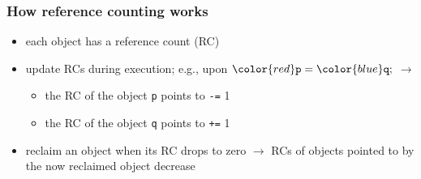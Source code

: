 \documentclass[12pt,dvipdfmx]{beamer}
\newif\ifja
\newif\ifeng
\newcommand{\ao}[1]{{\color{blue}#1}}
\newcommand{\aka}[1]{{\color{red}#1}}
\begin{document}
\begin{frame}[fragile]
\frametitle{How reference counting works}
\begin{itemize}
\item each object has a reference count (RC)
\item update RCs during execution;
  e.g., upon $\aka{\tt p} = \ao{\tt q};$
$\rightarrow$
  \begin{itemize}
  \item the RC of the object \aka{\tt p} points to {\tt -=} 1
  \item the RC of the object \ao{\tt q} points to {\tt +=} 1
  \end{itemize}
\item reclaim an object when its RC drops to zero
  $\rightarrow$
  RCs of objects pointed to by the now reclaimed object
  decrease
\end{itemize}

\begin{center}
%
%
%
%
\end{center}
\end{frame}
\fi


\ifja
\begin{frame}[fragile]
\frametitle{参照数が変化するのは}
\begin{itemize}
\item pointer update {\tt p = q;} {\tt p->f = q;} etc.
\item variables go out of scope
  
\end{itemize}
\end{frame}
\fi
\ifeng
\begin{frame}[fragile]
\frametitle{When an RC changes}
\begin{itemize}
\item a pointer is updated {\tt \aka{p} = \ao{q};} {\tt \aka{p->f} = \ao{q};} etc.
\item a function gets called
\begin{lstlisting}
int main() {
  object * q = ...;
  f(@\ao{\tt q}@);
}
\end{lstlisting}
\item a variable goes out of scope or a function returns
\begin{lstlisting}
f(object * p) {
  ...  
  {
    object * r = ...;

  } /* RC of @\aka{\tt r}@ should decrease */
  ...
  return ...; /* RC of @\aka{\tt p}@ should decrease */
}    
\end{lstlisting}
\item etc. any point pointer variables get copied / become no longer used
\end{itemize}
\end{frame}
\fi
\end{document}

